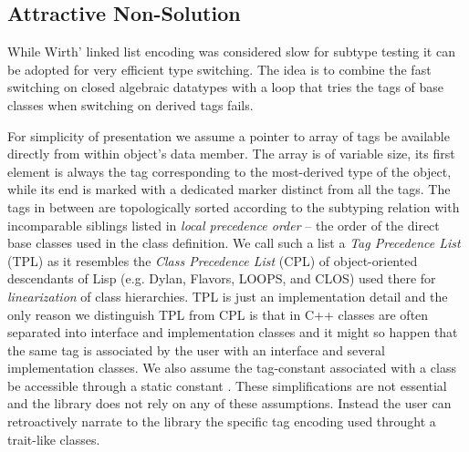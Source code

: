 \subsection{Attractive Non-Solution}
\label{sec:cotc}



While Wirth' linked list encoding was considered slow for subtype testing it can 
be adopted for very efficient type switching. The idea is to combine the fast 
switching on closed algebraic datatypes with a loop that tries the tags of base 
classes when switching on derived tags fails.


For simplicity of presentation we assume a pointer to array of tags be available 
directly from within object's  data member. The array is of 
variable size, its first element is always the tag corresponding to the 
most-derived type of the object, while its end is marked with a dedicated 
 marker distinct from all the tags. The tags in between are 
topologically sorted according to the subtyping relation with incomparable 
siblings listed in \emph{local precedence order} -- the order of the direct base 
classes used in the class definition. We call such a list a \emph{Tag Precedence 
List} (TPL) as it resembles the \emph{Class Precedence List} (CPL) of 
object-oriented descendants of Lisp (e.g. Dylan, Flavors, LOOPS, and CLOS) used 
there for \emph{linearization} of class hierarchies. TPL is just an implementation 
detail and the only reason we distinguish TPL from CPL is that in C++ classes 
are often separated into interface and implementation classes and it might so 
happen that the same tag is associated by the user with an interface and several 
implementation classes. We also assume the tag-constant associated with a class 
 be accessible through a static constant . These 
simplifications are not essential and the library does not rely on any of these 
assumptions. Instead the user can retroactively narrate to the library the 
specific tag encoding used throught a trait-like classes.


